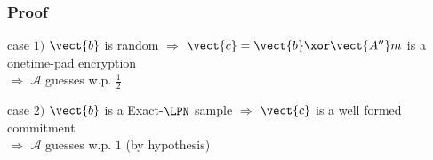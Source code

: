 \begin{frame}
\frametitle{Proof}

\begin{overprint}
 \begin{center}\end{center}
 \begin{center}\end{center}
 \begin{center}\end{center}
 \begin{center}\end{center} 
 \begin{center}\end{center}
 \begin{center}\end{center}
 \end{overprint}
 
 \begin{overprint}
\begin{block}{case $1)$  }
$\vect{b}$ is random $\Rightarrow$ $\vect{c} = \vect{b} \xor \vect{A''}m$ is a \alert{onetime-pad} encryption\\
\centering $\Rightarrow$ $\mathcal{A}$ guesses w.p. $\frac{1}{2}$\\
\end{block}

\begin{block}{case $2)$  }
$\vect{b}$ is a Exact-$\LPN$ sample $\Rightarrow$ $\vect{c}$ is a well formed commitment\\
\centering  $\Rightarrow$ $\mathcal{A}$ guesses w.p. $1$ (by hypothesis)\\ 
\end{block}

\end{overprint}

\end{frame}

